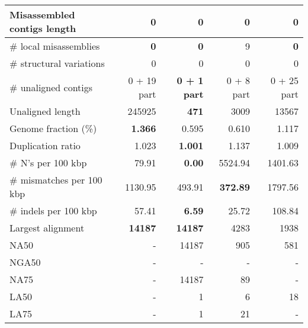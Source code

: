 \documentclass[12pt,a4paper]{article}
\begin{document}
\begin{table}[ht]
\begin{center}
\begin{tabular}{|l*{4}{|r}|}
Misassembled contigs length & 0 & 0 & 0 & 0 \\ \hline
\# local misassemblies & {\bf 0} & {\bf 0} & 9 & {\bf 0} \\ \hline
\# structural variations & 0 & 0 & 0 & 0 \\ \hline
\# unaligned contigs & 0 + 19 part & {\bf 0 + 1 part} & 0 + 8 part & 0 + 25 part \\ \hline
Unaligned length & 245925 & {\bf 471} & 3009 & 13567 \\ \hline
Genome fraction (\%) & {\bf 1.366} & 0.595 & 0.610 & 1.117 \\ \hline
Duplication ratio & 1.023 & {\bf 1.001} & 1.137 & 1.009 \\ \hline
\# N's per 100 kbp & 79.91 & {\bf 0.00} & 5524.94 & 1401.63 \\ \hline
\# mismatches per 100 kbp & 1130.95 & 493.91 & {\bf 372.89} & 1797.56 \\ \hline
\# indels per 100 kbp & 57.41 & {\bf 6.59} & 25.72 & 108.84 \\ \hline
Largest alignment & {\bf 14187} & {\bf 14187} & 4283 & 1938 \\ \hline
NA50 & - & 14187 & 905 & 581 \\ \hline
NGA50 & - & - & - & - \\ \hline
NA75 & - & 14187 & 89 & - \\ \hline
LA50 & - & 1 & 6 & 18 \\ \hline
LA75 & - & 1 & 21 & - \\ \hline
\end{tabular}
\end{center}
\end{table}
\end{document}
